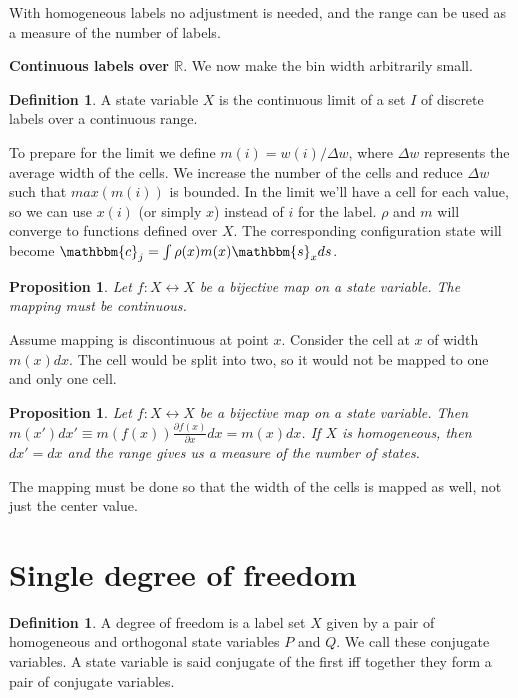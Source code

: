 \documentclass[twocolumn,floatfix,nofootinbib]{revtex4}   %
\theoremstyle{theorem}
\newtheorem{prop}[thm]{Proposition}
\theoremstyle{definition}
\newtheorem{defn}[thm]{Definition}
\begin{document}
With homogeneous labels no adjustment is needed, and the range can be used as a measure of the number of labels.

\textbf{Continuous labels over $\mathbb{R}$}. We now make the bin width arbitrarily small.

\begin{defn}\label{continuousLabels}
A state variable $X$ is the continuous limit of a set $I$ of discrete labels over a continuous range.
\end{defn}

To prepare for the limit we define $m(i)=w(i)/\Delta w$, where $\Delta w$ represents the average width of the cells. We increase the number of the cells and reduce $\Delta w$ such that $max(m(i))$ is bounded. In the limit we'll have a cell for each value, so we can use $x(i)$ (or simply $x$) instead of $i$ for the label. $\rho$ and $m$ will converge to functions defined over $X$. The corresponding configuration state will become $\mathbbm{c}_j=\int \rho(x) m(x) \mathbbm{s}_x ds$.

\begin{prop}\label{continuousMapping}
Let $f: X \leftrightarrow X$ be a bijective map on a state variable. The mapping must be continuous.
\end{prop}
Assume mapping is discontinuous at point $x$. Consider the cell at $x$ of width $m(x)dx$. The cell would be split into two, so it would not be mapped to one and only one cell.

\begin{prop}\label{widthMapping}
Let $f: X \leftrightarrow X$ be a bijective map on a state variable. Then $m(x') dx' \equiv m(f(x)) \frac{\partial f(x)}{\partial x} dx = m(x) dx$. If $X$ is homogeneous, then $dx' = dx$ and the range gives us a measure of the number of states.
\end{prop}
The mapping must be done so that the width of the cells is mapped as well, not just the center value.

\section{Single degree of freedom}

\begin{defn}\label{sdof}
A degree of freedom is a label set $X$ given by a pair of homogeneous and orthogonal state variables $P$ and $Q$. We call these conjugate variables. A state variable is said conjugate of the first iff together they form a pair of conjugate variables.
\end{defn}
\end{document}

